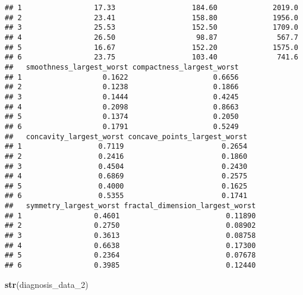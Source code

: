 \documentclass[]{article}
\newenvironment{Shaded}{\begin{snugshade}}{\end{snugshade}}
\newcommand{\KeywordTok}[1]{\textcolor[rgb]{0.13,0.29,0.53}{\textbf{#1}}}
\newcommand{\DecValTok}[1]{\textcolor[rgb]{0.00,0.00,0.81}{#1}}
\newcommand{\NormalTok}[1]{#1}
\begin{document}
\begin{verbatim}
## 1                 17.33                  184.60             2019.0
## 2                 23.41                  158.80             1956.0
## 3                 25.53                  152.50             1709.0
## 4                 26.50                   98.87              567.7
## 5                 16.67                  152.20             1575.0
## 6                 23.75                  103.40              741.6
##   smoothness_largest_worst compactness_largest_worst
## 1                   0.1622                    0.6656
## 2                   0.1238                    0.1866
## 3                   0.1444                    0.4245
## 4                   0.2098                    0.8663
## 5                   0.1374                    0.2050
## 6                   0.1791                    0.5249
##   concavity_largest_worst concave_points_largest_worst
## 1                  0.7119                       0.2654
## 2                  0.2416                       0.1860
## 3                  0.4504                       0.2430
## 4                  0.6869                       0.2575
## 5                  0.4000                       0.1625
## 6                  0.5355                       0.1741
##   symmetry_largest_worst fractal_dimension_largest_worst
## 1                 0.4601                         0.11890
## 2                 0.2750                         0.08902
## 3                 0.3613                         0.08758
## 4                 0.6638                         0.17300
## 5                 0.2364                         0.07678
## 6                 0.3985                         0.12440
\end{verbatim}

\begin{Shaded}
\begin{Highlighting}[]
\KeywordTok{str}\NormalTok{(diagnosis_data_}\DecValTok{2}\NormalTok{)}
\end{Highlighting}
\end{Shaded}
\end{document}
